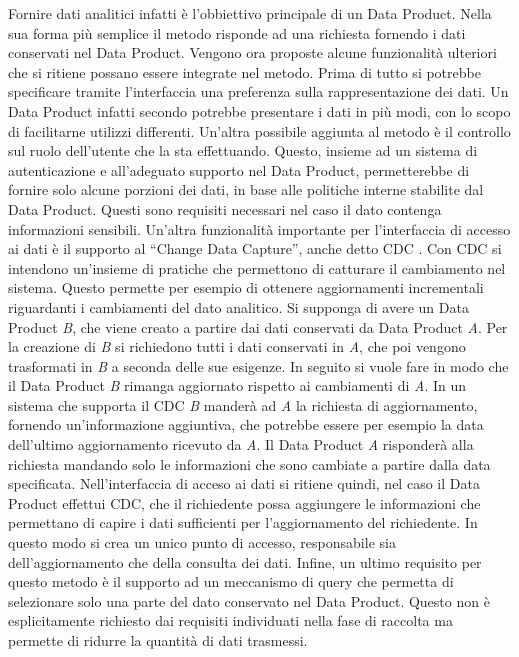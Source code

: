 \documentclass[12pt]{report}
\begin{document}
Fornire dati analitici infatti è l'obbiettivo principale di un Data Product.
Nella sua forma più semplice il metodo risponde ad una richiesta fornendo i dati conservati nel Data Product.
Vengono ora proposte alcune funzionalità ulteriori che si ritiene possano essere integrate nel metodo.
Prima di tutto si potrebbe specificare tramite l'interfaccia una preferenza sulla rappresentazione dei dati. 
Un Data Product infatti secondo \cite{zhamak_dehgani_data_2023} potrebbe presentare i dati in più modi, con lo scopo di facilitarne utilizzi differenti.
Un'altra possibile aggiunta al metodo è il controllo sul ruolo dell'utente che la sta effettuando. 
Questo, insieme ad un sistema di autenticazione e all'adeguato supporto nel Data Product, permetterebbe di fornire solo alcune porzioni dei dati, in base alle politiche interne stabilite dal Data Product.
Questi sono requisiti necessari nel caso il dato contenga informazioni sensibili.
Un'altra funzionalità importante per l'interfaccia di accesso ai dati è il supporto al ``Change Data Capture'', anche detto CDC \cite{eventSourcing,petrie2018streaming}.
Con CDC si intendono un'insieme di pratiche che permettono di catturare il cambiamento nel sistema.
Questo permette per esempio di ottenere aggiornamenti incrementali riguardanti i cambiamenti del dato analitico.
Si supponga di avere un Data Product \textit{B}, che viene creato a partire dai dati conservati da Data Product \textit{A}. 
Per la creazione di \textit{B} si richiedono tutti i dati conservati in \textit{A}, che poi vengono trasformati in \textit{B} a seconda delle sue esigenze.
In seguito si vuole fare in modo che il Data Product \textit{B} rimanga aggiornato rispetto ai cambiamenti di \textit{A}.
In un sistema che supporta il CDC \textit{B} manderà ad \textit{A} la richiesta di aggiornamento, fornendo un'informazione aggiuntiva, che potrebbe essere per esempio la data dell'ultimo aggiornamento ricevuto da \textit{A}.
Il Data Product \textit{A} risponderà alla richiesta mandando solo le informazioni che sono cambiate a partire dalla data specificata.
Nell'interfaccia di acceso ai dati si ritiene quindi, nel caso il Data Product effettui CDC, che il richiedente possa aggiungere le informazioni che permettano di capire i dati sufficienti per l'aggiornamento del richiedente.
In questo modo si crea un unico punto di accesso, responsabile sia dell'aggiornamento che della consulta dei dati.
Infine, un ultimo requisito per questo metodo è il supporto ad un meccanismo di query che permetta di selezionare solo una parte del dato conservato nel Data Product.
Questo non è esplicitamente richiesto dai requisiti individuati nella fase di raccolta ma permette di ridurre la quantità di dati trasmessi.
\end{document}
